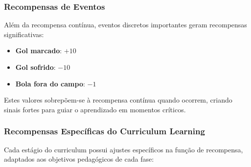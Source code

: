 \subsubsection{Recompensas de Eventos}

Além da recompensa contínua, eventos discretos importantes geram recompensas significativas:

\begin{itemize}
    \item \textbf{Gol marcado}: $+10$
    \item \textbf{Gol sofrido}: $-10$
    \item \textbf{Bola fora do campo}: $-1$
\end{itemize}

Estes valores sobrepõem-se à recompensa contínua quando ocorrem, criando sinais fortes para guiar o aprendizado em momentos críticos.

\subsubsection{Recompensas Específicas do Curriculum Learning}

Cada estágio do curriculum possui ajustes específicos na função de recompensa, adaptados aos objetivos pedagógicos de cada fase:

